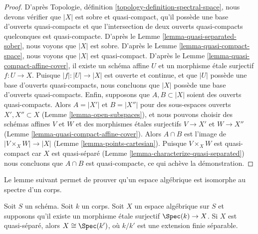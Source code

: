 \begin{proof}
D'après Topologie, définition \ref{topology-definition-spectral-space},
nous devons vérifier que $|X|$ est sobre et quasi-compact, qu'il possède une base
d'ouverts quasi-compacts et que l'intersection de deux
ouverts quasi-compacts quelconques est quasi-compacte. D'après le
Lemme \ref{lemma-quasi-separated-sober}, nous voyons que $|X|$ est sobre.
D'après le Lemme \ref{lemma-quasi-compact-space}, nous voyons que $|X|$ est quasi-compact.
D'après le Lemme \ref{lemma-quasi-compact-affine-cover}, il existe un schéma affine
$U$ et un morphisme \'etale surjectif $f : U \to X$.
Puisque $|f| : |U| \to |X|$ est ouverte et continue, et que $|U|$ possède
une base d'ouverts quasi-compacts, nous concluons que $|X|$ possède une base
d'ouverts quasi-compacts. Enfin, supposons que
$A, B \subset |X|$ soient des ouverts quasi-compacts. Alors $A = |X'|$ et $B = |X''|$
pour des sous-espaces ouverts $X', X'' \subset X$ (Lemme \ref{lemma-open-subspaces}),
et nous pouvons choisir des schémas affines $V$ et $W$ et des morphismes
\'etales surjectifs $V \to X'$ et $W \to X''$
(Lemme \ref{lemma-quasi-compact-affine-cover}).
Alors $A \cap B$ est l'image de
$|V \times_X W| \to |X|$ (Lemme \ref{lemma-points-cartesian}).
Puisque $V \times_X W$ est quasi-compact car $X$ est quasi-séparé
(Lemme \ref{lemma-characterize-quasi-separated})
nous concluons que $A \cap B$ est quasi-compacte, ce qui achève la démonstration.
\end{proof}

\noindent
Le lemme suivant permet de prouver qu'un
espace algébrique est isomorphe au spectre d'un corps.

\begin{lemma}
\label{lemma-point-like-spaces}
Soit $S$ un schéma. Soit $k$ un corps.
Soit $X$ un espace algébrique sur $S$ et supposons qu'il existe
un morphisme \'etale surjectif $\Spec(k) \to X$.
Si $X$ est quasi-séparé, alors $X \cong \Spec(k')$,
où $k/k'$ est une extension finie séparable.
\end{lemma}

